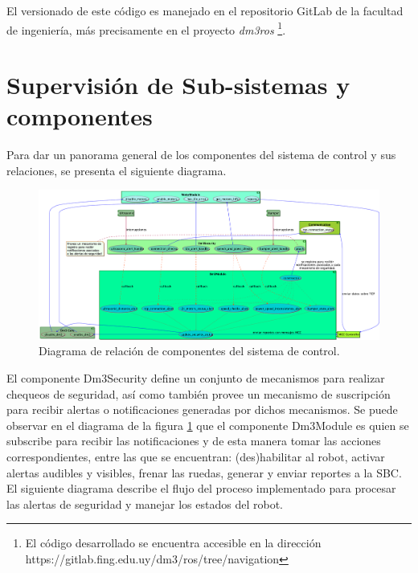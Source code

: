\documentclass[withindex,glossary]{cam-thesis}
\begin{document}
El versionado de este código es manejado en el repositorio GitLab de la facultad de ingeniería, más precisamente en el proyecto \textit{dm3\/ros} \footnote{El código desarrollado se encuentra accesible en la dirección https://gitlab.fing.edu.uy/dm3/ros/tree/navigation}.

\section{Supervisión de Sub-sistemas y componentes} \label{sec: Implementación :: Supervisión}
Para dar un panorama general de los componentes del sistema de control y sus relaciones, se presenta el siguiente diagrama.

\begin{figure}[H]
\centering
\label{fig: Diagrama_de_subsistema_Dm3Security}
\includegraphics[width=\textwidth]{images/Diagrama_de_subsistema_Dm3Security}
\caption[Diagrama del sub-sistema Dm3Security]{Diagrama de relación de componentes del sistema de control.}
\end{figure}

El componente Dm3Security define un conjunto de mecanismos para realizar chequeos de seguridad, así como también provee un mecanismo de suscripción para recibir alertas o notificaciones generadas por dichos mecanismos. Se puede observar en el diagrama de la figura \ref{fig: Diagrama_de_subsistema_Dm3Security} que el componente Dm3Module es quien se subscribe para recibir las notificaciones y de esta manera tomar las acciones correspondientes, entre las que se encuentran: (des)habilitar al robot, activar alertas audibles y visibles, frenar las ruedas, generar y enviar reportes a la \gls{SBC}.
El siguiente diagrama describe el flujo del proceso implementado para procesar las alertas de seguridad y manejar los estados del robot.
\end{document}
